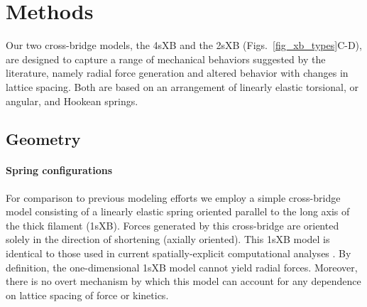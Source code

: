 \documentclass[]{article}
\begin{document}
\section{Methods}  %

Our two cross-bridge models, the 4sXB and the 2sXB (Figs.~\ref{fig_xb_types}C-D), are designed to capture a range of mechanical behaviors suggested by the literature, namely radial force generation and altered behavior with changes in lattice spacing.  
Both are based on an arrangement of linearly elastic torsional, or angular, and Hookean springs.  

\subsection*{Geometry} %

\paragraph{Spring configurations} %
For comparison to previous modeling efforts we employ a simple cross-bridge model consisting of a linearly elastic spring oriented parallel to the long axis of the thick filament (1sXB).  
Forces generated by this cross-bridge are oriented solely in the direction of shortening (axially oriented). 
This 1sXB model is identical to those used in current spatially-explicit computational analyses \citep{Daniel1998, Chase2004, Tanner2007}. 
By definition, the one-dimensional 1sXB model cannot yield radial forces.  
Moreover, there is no overt mechanism by which this model can account for any dependence on lattice spacing of force or kinetics.
\end{document}
